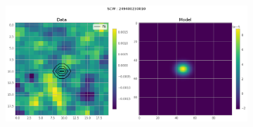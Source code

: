 \documentclass[
	a4paper, %
	10pt, %
	unnumberedsections, %
	twoside, %
]{LTJournalArticle}
\begin{document}
\begin{figure}[H]
\begin{subfigure}{.47\textwidth}
    \end{subfigure}
    \hspace{1em}
    \begin{subfigure}{.47\textwidth}
        \includegraphics[width=\textwidth]{report/Figures/models/2204/23_psf_const.png}
    \end{subfigure}%
    \label{model_notconst_22}
    \caption{}
    \end{figure}
\end{document}
